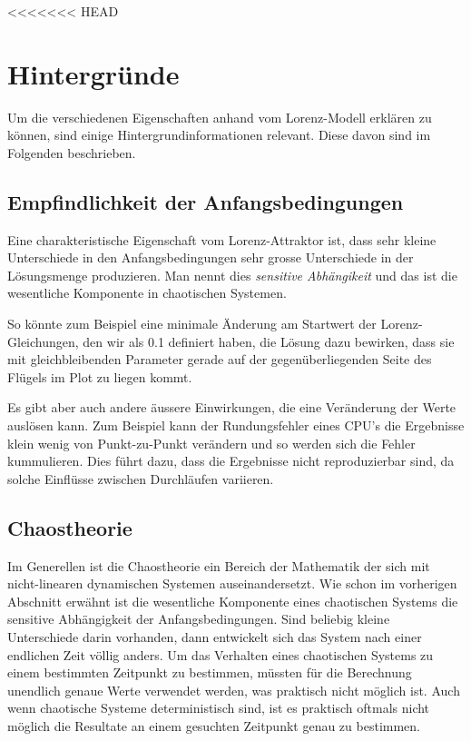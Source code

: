 
<<<<<<< HEAD
\section{Hintergründe}
Um die verschiedenen Eigenschaften anhand vom Lorenz-Modell erklären zu können, sind einige Hintergrundinformationen relevant. Diese davon sind im Folgenden beschrieben.

\subsection{Empfindlichkeit der Anfangsbedingungen}
Eine charakteristische Eigenschaft vom Lorenz-Attraktor ist, dass sehr kleine Unterschiede in den Anfangsbedingungen sehr grosse Unterschiede in der Lösungsmenge produzieren. Man nennt dies \textit{sensitive Abhängikeit} und das ist die wesentliche Komponente in chaotischen Systemen. 

So könnte zum Beispiel eine minimale Änderung am Startwert der Lorenz-Gleichungen, den wir als 0.1 definiert haben, die Lösung dazu bewirken, dass sie mit gleichbleibenden Parameter gerade auf der gegenüberliegenden Seite des Flügels im Plot zu liegen kommt. 

Es gibt aber auch andere äussere Einwirkungen, die eine Veränderung der Werte auslösen kann. Zum Beispiel kann der Rundungsfehler eines CPU's die Ergebnisse klein wenig von Punkt-zu-Punkt verändern und so werden sich die Fehler kummulieren. Dies führt dazu, dass die Ergebnisse nicht reproduzierbar sind, da solche Einflüsse zwischen Durchläufen variieren.

\subsection{Chaostheorie}
Im Generellen ist die Chaostheorie ein Bereich der Mathematik der sich mit nicht-linearen dynamischen Systemen auseinandersetzt. Wie schon im vorherigen Abschnitt erwähnt ist die wesentliche Komponente eines chaotischen Systems die sensitive Abhängigkeit der Anfangsbedingungen. Sind beliebig kleine Unterschiede darin vorhanden, dann entwickelt sich das System nach einer endlichen Zeit völlig anders. Um das Verhalten eines chaotischen Systems zu einem bestimmten Zeitpunkt zu bestimmen, müssten für die Berechnung unendlich genaue Werte verwendet werden, was praktisch nicht möglich ist. Auch wenn chaotische Systeme deterministisch sind, ist es praktisch oftmals nicht möglich die Resultate an einem gesuchten Zeitpunkt genau zu bestimmen. 


